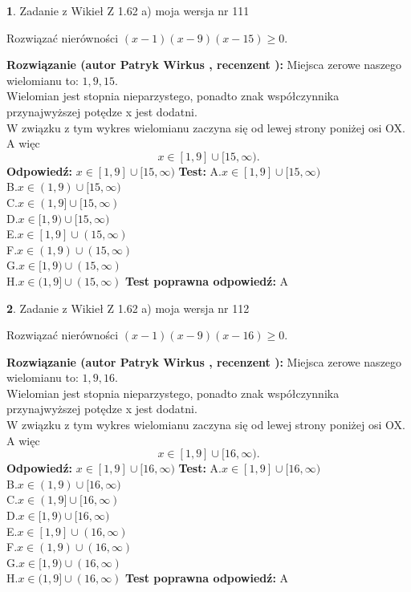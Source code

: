 \documentclass[12pt, a4paper]{article}
\theoremstyle{definition} %
\newtheorem{zad}{}
\newcommand{\zadStart}[1]{\begin{zad}#1\newline}
\newcommand{\zadStop}{\end{zad}}
\newcommand{\rozwStart}[2]{\noindent \textbf{Rozwiązanie (autor #1 , recenzent #2): }\newline}
\newcommand{\rozwStop}{\newline}
\newcommand{\odpStart}{\noindent \textbf{Odpowiedź:}\newline}
\newcommand{\odpStop}{\newline}
\newcommand{\testStart}{\noindent \textbf{Test:}\newline}
\newcommand{\testStop}{\newline}
\newcommand{\kluczStart}{\noindent \textbf{Test poprawna odpowiedź:}\newline}
\newcommand{\kluczStop}{\newline}
\begin{document}
\zadStart{Zadanie z Wikieł Z 1.62 a) moja wersja nr 111}

Rozwiązać nierówności $(x-1)(x-9)(x-15)\ge0$.
\zadStop
\rozwStart{Patryk Wirkus}{}
Miejsca zerowe naszego wielomianu to: $1, 9, 15$.\\
Wielomian jest stopnia nieparzystego, ponadto znak współczynnika przy\linebreak najwyższej potędze x jest dodatni.\\ W związku z tym wykres wielomianu zaczyna się od lewej strony poniżej osi OX. A więc $$x \in [1,9] \cup [15,\infty).$$
\rozwStop
\odpStart
$x \in [1,9] \cup [15,\infty)$
\odpStop
\testStart
A.$x \in [1,9] \cup [15,\infty)$\\
B.$x \in (1,9) \cup [15,\infty)$\\
C.$x \in (1,9] \cup [15,\infty)$\\
D.$x \in [1,9) \cup [15,\infty)$\\
E.$x \in [1,9] \cup (15,\infty)$\\
F.$x \in (1,9) \cup (15,\infty)$\\
G.$x \in [1,9) \cup (15,\infty)$\\
H.$x \in (1,9] \cup (15,\infty)$
\testStop
\kluczStart
A
\kluczStop



\zadStart{Zadanie z Wikieł Z 1.62 a) moja wersja nr 112}

Rozwiązać nierówności $(x-1)(x-9)(x-16)\ge0$.
\zadStop
\rozwStart{Patryk Wirkus}{}
Miejsca zerowe naszego wielomianu to: $1, 9, 16$.\\
Wielomian jest stopnia nieparzystego, ponadto znak współczynnika przy\linebreak najwyższej potędze x jest dodatni.\\ W związku z tym wykres wielomianu zaczyna się od lewej strony poniżej osi OX. A więc $$x \in [1,9] \cup [16,\infty).$$
\rozwStop
\odpStart
$x \in [1,9] \cup [16,\infty)$
\odpStop
\testStart
A.$x \in [1,9] \cup [16,\infty)$\\
B.$x \in (1,9) \cup [16,\infty)$\\
C.$x \in (1,9] \cup [16,\infty)$\\
D.$x \in [1,9) \cup [16,\infty)$\\
E.$x \in [1,9] \cup (16,\infty)$\\
F.$x \in (1,9) \cup (16,\infty)$\\
G.$x \in [1,9) \cup (16,\infty)$\\
H.$x \in (1,9] \cup (16,\infty)$
\testStop
\kluczStart
A
\kluczStop
\end{document}
